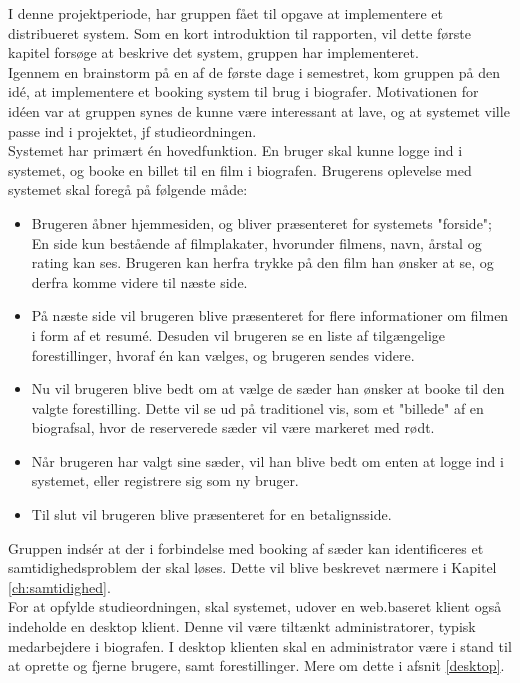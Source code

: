 I denne projektperiode, har gruppen fået til opgave at implementere et distribueret system. Som en kort introduktion til rapporten, vil dette første kapitel forsøge at beskrive det system,
gruppen har implementeret. \\

Igennem en brainstorm på en af de første dage i semestret, kom gruppen på den idé, at implementere et booking system til brug i 
biografer. Motivationen for idéen var at gruppen synes de kunne være interessant at lave, og at systemet ville passe ind i projektet, jf studieordningen. \\

Systemet har primært én hovedfunktion. En bruger skal kunne logge ind i systemet, og booke en billet til en film i biografen. Brugerens oplevelse med systemet skal foregå på følgende måde:

\begin{itemize}
    \item Brugeren åbner hjemmesiden, og bliver præsenteret for systemets "forside"; En side kun bestående af filmplakater, hvorunder filmens, navn, årstal og rating kan ses. Brugeren kan herfra trykke på den film han ønsker at se, og derfra komme videre til næste side.
    \item På næste side vil brugeren blive præsenteret for flere informationer om filmen i form af et resumé. Desuden vil brugeren se en liste af tilgængelige forestillinger, hvoraf én kan vælges, og brugeren sendes videre.
    \item Nu vil brugeren blive bedt om at vælge de sæder han ønsker at booke til den valgte forestilling. Dette vil se ud på traditionel vis, som et "billede" af en biografsal, hvor de reserverede sæder vil være markeret med rødt.
    \item Når brugeren har valgt sine sæder, vil han blive bedt om enten at logge ind i systemet, eller registrere sig som ny bruger.
    \item Til slut vil brugeren blive præsenteret for en betalignsside.
\end{itemize}

Gruppen indsér at der i forbindelse med booking af sæder kan identificeres et samtidighedsproblem der skal løses. Dette vil blive beskrevet nærmere i Kapitel \ref{ch:samtidighed}. \\

For at opfylde studieordningen, skal systemet, udover en web.baseret klient også indeholde en desktop klient. Denne vil være tiltænkt administratorer, typisk medarbejdere i biografen.
I desktop klienten skal en administrator være i stand til at oprette og fjerne brugere, samt forestillinger. Mere om dette i afsnit \ref{desktop}.